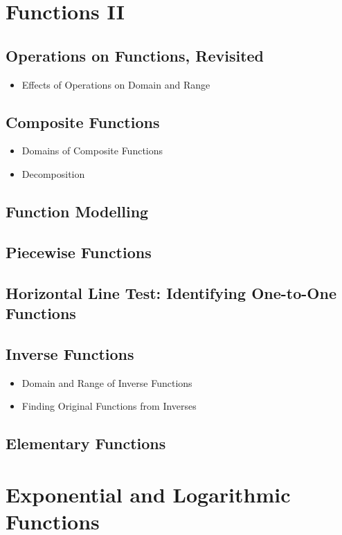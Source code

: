 \documentclass[11pt]{article}
\begin{document}
\setcounter{section}{14}
\section{Functions II}
\subsection{Operations on Functions, Revisited}
\begin{itemize}
    \item Effects of Operations on Domain and Range
\end{itemize}
\subsection{Composite Functions}
\begin{itemize}
    \item Domains of Composite Functions
    \item Decomposition
\end{itemize}
\subsection{Function Modelling}
\subsection{Piecewise Functions}
\subsection{Horizontal Line Test: Identifying One-to-One Functions}
\subsection{Inverse Functions}
\begin{itemize}
    \item Domain and Range of Inverse Functions
    \item Finding Original Functions from Inverses
\end{itemize}
\subsection{Elementary Functions}

\setcounter{section}{15}
\section{Exponential and Logarithmic Functions}
\end{document}
